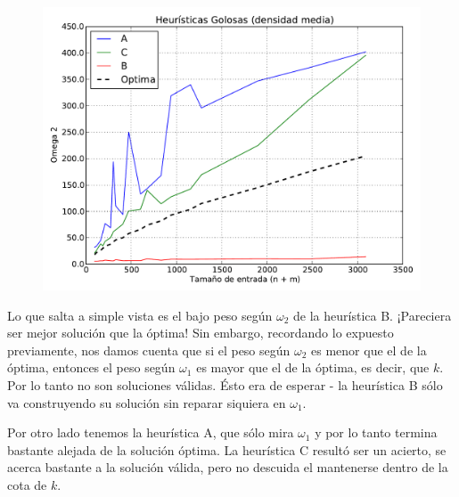 \begin{figure}[H]
\begin{center}
\includegraphics[angle=0, scale=.75]{imagenes/calidad_greedy_2014-06-27_09-50-48.pdf}
\label{grafico local}
\end{center}
\end{figure}

Lo que salta a simple vista es el bajo peso según $\omega_2$ de la heurística B. ¡Pareciera ser mejor solución que la óptima! Sin embargo,
recordando lo expuesto previamente, nos damos cuenta que si el peso según $\omega_2$ es menor que el de la óptima, entonces el peso según
$\omega_1$ es mayor que el de la óptima, es decir, que $k$. Por lo tanto no son soluciones válidas.
Ésto era de esperar - la heurística B sólo va construyendo su solución sin reparar siquiera en $\omega_1$.

Por otro lado tenemos la heurística A, que sólo mira $\omega_1$ y por lo tanto termina bastante alejada de la solución óptima. La heurística
C resultó ser un acierto, se acerca bastante a la solución válida, pero no descuida el mantenerse dentro de la cota de $k$.
